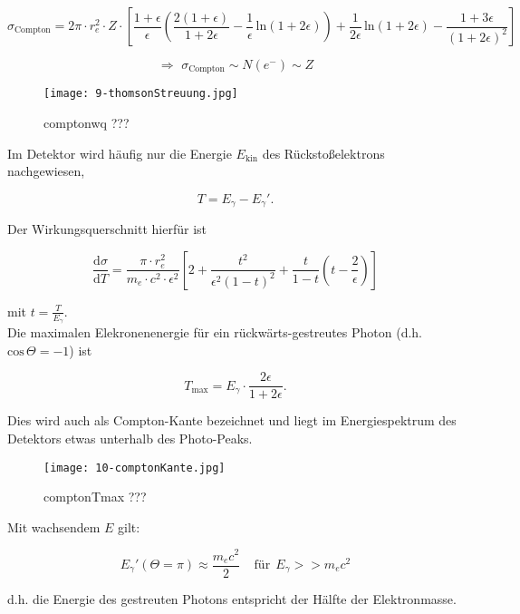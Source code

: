 \[\sigma_{\text{Compton}} = 2\pi \cdot r_e^2\cdot Z \cdot
\left[\frac{1+\epsilon}{\epsilon}\left( \frac{2(1+\epsilon)}{1+2\epsilon} -
\frac{1}{\epsilon}\,\text{ln}(1+2\epsilon) \right) + \frac{1}{2\epsilon}\,\text{ln}(1+2\epsilon) -
\frac{1+3\epsilon}{(1+2\epsilon)^2} \right] \]

\[\Rightarrow\,\, \sigma_{\text{Compton}} \sim N(e^-) \sim Z  \]

\begin{figure}[H]
	\centering
	\texttt{[image: 9-thomsonStreuung.jpg]}
	\caption{	comptonwq ???}
	\label{comptonwq}
\end{figure}

Im Detektor wird häufig nur die Energie $E_{\text{kin}}$ des Rückstoßelektrons nachgewiesen,

\[T= E_\gamma -E_\gamma'.  \]

Der Wirkungsquerschnitt hierfür ist

\[\frac{\mathrm{d}\sigma}{\mathrm{d}T} = \frac{\pi\cdot r_e^2}{m_e\cdot c^2\cdot \epsilon^2} \left[
2+ \frac{t^2}{\epsilon^2(1-t)^2} +\frac{t}{1-t}\left(t-\frac{2}{\epsilon} \right) \right] \]

mit $t=\frac{T}{E_\gamma}$.
\\
Die maximalen Elekronenenergie für ein rückwärts-gestreutes Photon (d.h. $\text{cos}\,\Theta=-1$)
ist

\[T_{\text{max}} = E_\gamma\cdot \frac{2\epsilon}{1+2\epsilon}. \] 

Dies wird auch als Compton-Kante bezeichnet und liegt im Energiespektrum des Detektors etwas
unterhalb des Photo-Peaks.

\begin{figure}[H]
	\centering
	\texttt{[image: 10-comptonKante.jpg]}
	\caption{	comptonTmax ???}
	\label{comptonTmax}
\end{figure}

Mit wachsendem $E$ gilt:

\[E_\gamma'(\Theta=\pi) \approx \frac{m_ec^2}{2}~~~~~\text{für}~~E_\gamma>>m_ec^2  \]

d.h. die Energie des gestreuten Photons entspricht der Hälfte der Elektronmasse.